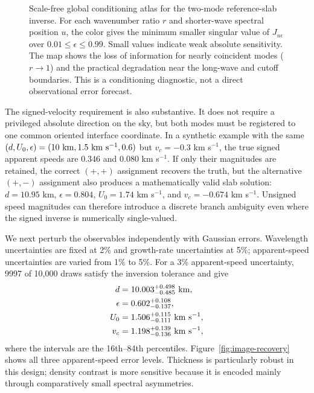 \documentclass[linenumbers]{aastex7}
\begin{document}
\begin{figure}
\caption{Scale-free global conditioning atlas for the two-mode reference-slab inverse. For each wavenumber ratio $r$ and shorter-wave spectral position $u$, the color gives the minimum smaller singular value of $J_{u\epsilon}$ over $0.01\leq\epsilon\leq0.99$. Small values indicate weak absolute sensitivity. The map shows the loss of information for nearly coincident modes ($r\rightarrow1$) and the practical degradation near the long-wave and cutoff boundaries. This is a conditioning diagnostic, not a direct observational error forecast.}
\label{fig:global-atlas}
\end{figure}

The signed-velocity requirement is also substantive. It does not require a privileged absolute direction on the sky, but both modes must be registered to one common oriented interface coordinate. In a synthetic example with the same $(d,U_0,\epsilon)=(10~{\rm km},1.5~{\rm km~s^{-1}},0.6)$ but $v_c=-0.3$ km s$^{-1}$, the true signed apparent speeds are 0.346 and 0.080 km s$^{-1}$. If only their magnitudes are retained, the correct $(+,+)$ assignment recovers the truth, but the alternative $(+,-)$ assignment also produces a mathematically valid slab solution: $d=10.95$ km, $\epsilon=0.804$, $U_0=1.74$ km s$^{-1}$, and $v_c=-0.674$ km s$^{-1}$. Unsigned speed magnitudes can therefore introduce a discrete branch ambiguity even where the signed inverse is numerically single-valued.

We next perturb the observables independently with Gaussian errors. Wavelength uncertainties are fixed at 2\% and growth-rate uncertainties at 5\%; apparent-speed uncertainties are varied from 1\% to 5\%. For a 3\% apparent-speed uncertainty, 9997 of 10,000 draws satisfy the inversion tolerance and give
\begin{align}
d&=10.003^{+0.498}_{-0.485}~{\rm km},\\
\epsilon&=0.602^{+0.108}_{-0.137},\\
U_0&=1.506^{+0.115}_{-0.111}~{\rm km~s^{-1}},\\
v_c&=1.198^{+0.139}_{-0.136}~{\rm km~s^{-1}},
\end{align}
where the intervals are the 16th--84th percentiles. Figure~\ref{fig:image-recovery} shows all three apparent-speed error levels. Thickness is particularly robust in this design; density contrast is more sensitive because it is encoded mainly through comparatively small spectral asymmetries.
\end{document}
